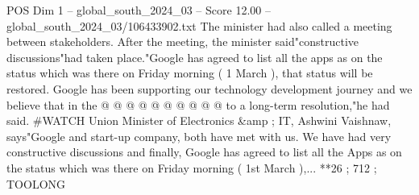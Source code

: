 \begin{textsample}{POS Dim 1 – global\_south\_2024\_03 – Score 12.00 – global\_south\_2024\_03/106433902.txt}
The minister had also called a meeting between stakeholders.
After the meeting, the minister said"constructive discussions"had taken place."Google has agreed to list all the apps as on the status which was there on Friday morning ( 1 March ), that status will be restored.
Google has been supporting our technology development journey and we believe that in the @ @ @ @ @ @ @ @ @ @ to a long-term resolution,"he had said. \#WATCH Union Minister of Electronics \&amp ; IT, Ashwini Vaishnaw, says"Google and start-up company, both have met with us.
We have had very constructive discussions and finally, Google has agreed to list all the Apps as on the status which was there on Friday morning ( 1st March ),... **26 ; 712 ; TOOLONG

\end{textsample}

